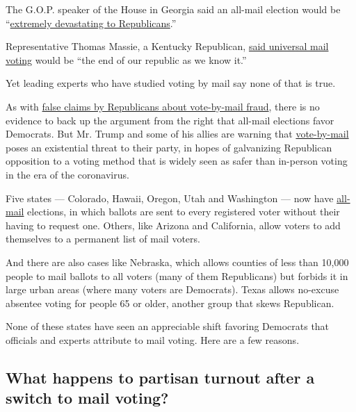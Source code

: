 The G.O.P. speaker of the House in Georgia said an all-mail election
would be
``\href{https://www.ajc.com/news/state—regional-govt—politics/pressure-mounts-for-further-delay-georgia-may-primary-election/K1wboFdcY1z7xYt7pa11MO/}{extremely
devastating to Republicans}.''

Representative Thomas Massie, a Kentucky Republican,
\href{https://twitter.com/repthomasmassie/status/1242573156776378371}{said
universal mail voting} would be ``the end of our republic as we know
it.''

Yet leading experts who have studied voting by mail say none of that is
true.

As with
\href{https://www.nytimes.com/article/mail-in-voting-explained.html}{false
claims by Republicans about vote-by-mail fraud}, there is no evidence to
back up the argument from the right that all-mail elections favor
Democrats. But Mr. Trump and some of his allies are warning that
\href{https://www.nytimes.com/2020/06/19/us/politics/nyc-vote-by-mail.html}{vote-by-mail}
poses an existential threat to their party, in hopes of galvanizing
Republican opposition to a voting method that is widely seen as safer
than in-person voting in the era of the coronavirus.

Five states --- Colorado, Hawaii, Oregon, Utah and Washington --- now
have
\href{https://www.ncsl.org/research/elections-and-campaigns/all-mail-elections.aspx}{all-mail}
elections, in which ballots are sent to every registered voter without
their having to request one. Others, like Arizona and California, allow
voters to add themselves to a permanent list of mail voters.

And there are also cases like Nebraska, which allows counties of less
than 10,000 people to mail ballots to all voters (many of them
Republicans) but forbids it in large urban areas (where many voters are
Democrats). Texas allows no-excuse absentee voting for people 65 or
older, another group that skews Republican.

None of these states have seen an appreciable shift favoring Democrats
that officials and experts attribute to mail voting. Here are a few
reasons.

\hypertarget{what-happens-to-partisan-turnout-after-a-switch-to-mail-voting}{%
\subsection{What happens to partisan turnout after a switch to mail
voting?}\label{what-happens-to-partisan-turnout-after-a-switch-to-mail-voting}}

